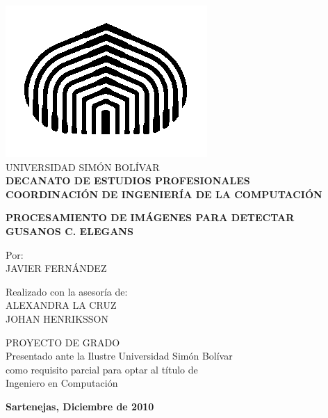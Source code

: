 \begin{titlepage}
\begin{center}

\includegraphics[scale=0.5,type=png,ext=.png,read=.png]{images/cebolla} \\

\textsc {\large UNIVERSIDAD SIM\'ON BOL\'IVAR} \\
\textsc{\bfseries DECANATO DE ESTUDIOS PROFESIONALES\\
COORDINACI\'ON DE INGENIER\'IA DE LA COMPUTACI\'ON}

\bigskip
\bigskip
\bigskip
\bigskip
\bigskip
\bigskip
\bigskip
\bigskip
\bigskip

\textsc{\bfseries PROCESAMIENTO DE IM\'AGENES PARA DETECTAR \\
GUSANOS C. ELEGANS}

\bigskip
\bigskip
\bigskip
\bigskip
\bigskip

\begin{minipage}{\textwidth}
\centering
Por: \\
JAVIER FERN\'ANDEZ \\

\bigskip
\bigskip
\bigskip

Realizado con la asesor\'ia de: \\
ALEXANDRA LA CRUZ\\
JOHAN HENRIKSSON
\end{minipage}

\bigskip
\bigskip
\bigskip
\bigskip
\bigskip
\bigskip
\bigskip
\bigskip
\bigskip

{PROYECTO DE GRADO \\ Presentado ante la Ilustre Universidad Sim\'on Bol\'ivar \\
como requisito parcial para optar al t\'itulo de \\ Ingeniero en Computaci\'on} \\

\bigskip
\bigskip
\vfill

{\large \bfseries Sartenejas, Diciembre de 2010}

\end{center}
\end{titlepage}
